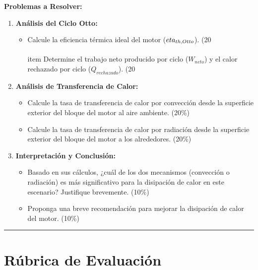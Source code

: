 \documentclass{article}
\begin{document}
\textbf{Problemas a Resolver:}

\begin{enumerate}
    \item \textbf{Análisis del Ciclo Otto:}
    \begin{itemize}
        \item Calcule la eficiencia térmica ideal del motor ($\\eta_{th,Otto}$). (20\\%
        \\item Determine el trabajo neto producido por ciclo ($W_{neto}$) y el calor rechazado por ciclo ($Q_{rechazado}$). (20\\%
    \end{itemize}
    \item \textbf{Análisis de Transferencia de Calor:}
    \begin{itemize}
        \item Calcule la tasa de transferencia de calor por convección desde la superficie exterior del bloque del motor al aire ambiente. (20\%)
        \item Calcule la tasa de transferencia de calor por radiación desde la superficie exterior del bloque del motor a los alrededores. (20\%)
    \end{itemize}
    \item \textbf{Interpretación y Conclusión:}
    \begin{itemize}
        \item Basado en sus cálculos, ¿cuál de los dos mecanismos (convección o radiación) es más significativo para la disipación de calor en este escenario? Justifique brevemente. (10\%)
        \item Proponga una breve recomendación para mejorar la disipación de calor del motor. (10\%)
    \end{itemize}
\end{enumerate}

\vspace{5mm}
\hrule
\vspace{5mm}

\newpage
\section*{Rúbrica de Evaluación}
\end{document}
